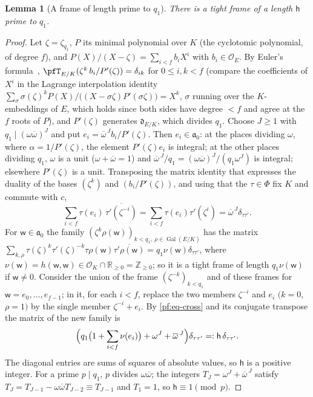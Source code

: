 \documentclass[10pt]{amsart}
\newtheorem{lemma}[theorem]{Lemma}
\theoremstyle{definition}
\theoremstyle{remark}
\newcommand{\R}{\mathbb R}
\newcommand{\Z}{\mathbb Z}
\providecommand{\auO}{\mathcal O}
\providecommand{\auPl}{\Phi}
\providecommand{\aubar}[1]{\overline{#1}}
\begin{document}
\begin{lemma}[A frame of length prime to $q_1$]\label{pf:frame}
There is a tight frame of a length $\mathsf h$ prime to $q_1$.
\end{lemma}
\begin{proof}
Let $\zeta=\zeta_{q_1}$, $P$ its minimal polynomial over $K$ (the cyclotomic polynomial, of degree
$f$), and $P(X)/(X-\zeta)=\sum_{i<f}b_iX^i$ with $b_i\in\auO_E$. By Euler's
formula~\cite[III, \S6, Lemma~2, p.~56]{SerreLF}, $\pfT_{E/K}(\zeta^k\,b_i/P'(\zeta))=\delta_{ik}$ for $0\le i,k<f$
(compare the coefficients of $X^i$ in the Lagrange interpolation identity
$\sum_{\sigma}\sigma(\zeta)^kP(X)/\bigl((X-\sigma\zeta)P'(\sigma\zeta)\bigr)=X^k$, $\sigma$ running over the
$K$-embeddings of $E$, which holds since both sides have degree $<f$ and agree at the $f$ roots of $P$),
and $P'(\zeta)$ generates $\mathfrak d_{E/K}$, which divides $q_1$. Choose $J\ge1$ with
$q_1\mid(\omega\aubar\omega)^J$ and put $e_i=\aubar\omega^{\,J}b_i/P'(\zeta)$. Then
$e_i\in\mathfrak a_0$: at the places dividing $\omega$, where $\alpha=1/P'(\zeta)$, the element
$P'(\zeta)e_i$ is integral; at the other places dividing $q_1$, $\omega$ is a unit
($\omega+\aubar\omega=1$) and $\aubar\omega^{\,J}/q_1=(\omega\aubar\omega)^J/(q_1\omega^J)$ is
integral; elsewhere $P'(\zeta)$ is a unit. Transposing the matrix identity that expresses the
duality of the bases $(\zeta^k)$ and $(b_i/P'(\zeta))$, and using that the $\tau\in\auPl$ fix $K$
and commute with $c$,
\begin{equation}\label{pf:eq-cross}
\sum_{i<f}\tau(e_i)\,\aubar{\tau'(\zeta^{-i})}=\sum_{i<f}\tau(e_i)\tau'(\zeta^{i})=\aubar\omega^{\,J}
\delta_{\tau\tau'} .
\end{equation}
For $\mathsf w\in\mathfrak a_0$ the family $(\zeta^k\rho(\mathsf w))_{k<q_1,\ \rho\in\operatorname{
Gal}(E/K)}$ has the matrix $\sum_{k,\rho}\tau(\zeta)^k\tau'(\zeta)^{-k}\tau\rho(\mathsf w)\aubar{
\tau'\rho(\mathsf w)}=q_1\nu(\mathsf w)\delta_{\tau\tau'}$, where $\nu(\mathsf w)=h(\mathsf w,
\mathsf w)\in\auO_K\cap\R_{\ge0}=\Z_{\ge0}$; so it is a tight frame of length $q_1\nu(\mathsf w)$
if $\mathsf w\ne0$. Consider the union of the frame $(\zeta^{-k})_{k<q_1}$ and of these frames for
$\mathsf w=e_0,\dots,e_{f-1}$; in it, for each $i<f$, replace the two members $\zeta^{-i}$ and
$e_i$ $(k=0$, $\rho=1)$ by the single member $\zeta^{-i}+e_i$. By \eqref{pf:eq-cross} and its
conjugate transpose the matrix of the new family is
\[
\Bigl(q_1\bigl(1+\sum_{i<f}\nu(e_i)\bigr)+\omega^J+\aubar\omega^{\,J}\Bigr)\delta_{\tau\tau'}=:
\mathsf h\,\delta_{\tau\tau'} .
\]
The diagonal entries are sums of squares of absolute values, so $\mathsf h$ is a positive integer.
For a prime $p\mid q_1$, $p$ divides $\omega\aubar\omega$; the integers $T_J=\omega^J+\aubar
\omega^{\,J}$ satisfy $T_J=T_{J-1}-\omega\aubar\omega T_{J-2}\equiv T_{J-1}$ and $T_1=1$, so
$\mathsf h\equiv1\pmod p$.
\end{proof}
\end{document}
